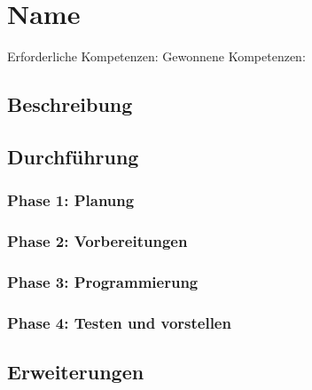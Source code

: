 \section{Name}

Erforderliche Kompetenzen:
Gewonnene Kompetenzen:

\subsection {Beschreibung}

\subsection {Durchführung}

\subsubsection{Phase 1: Planung}

\subsubsection{Phase 2: Vorbereitungen}

\subsubsection{Phase 3: Programmierung}

\subsubsection{Phase 4: Testen und vorstellen}

\subsection {Erweiterungen}

\newpage